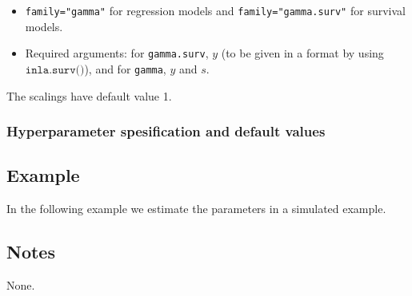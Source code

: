 \documentclass[a4paper,11pt]{article}
\begin{document}
\begin{itemize}
\item \texttt{family="gamma"} for regression models and
    \texttt{family="gamma.surv"} for survival models.
\item Required arguments: for \texttt{gamma.surv}, $y$ (to be given in
    a format by using $\texttt{inla.surv()}$), and for \texttt{gamma},
    $y$ and $s$.
\end{itemize}
The scalings have default value 1.

\subsubsection*{Hyperparameter spesification and default values}




\subsection*{Example}

In the following example we estimate the parameters in a simulated
example.


\subsection*{Notes}

None.
\end{document}
